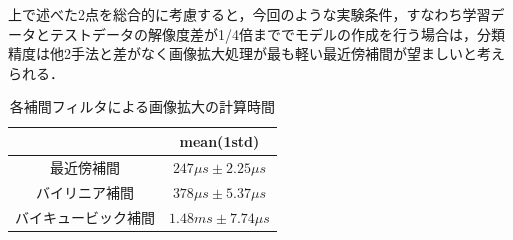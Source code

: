 \documentclass[a4j, 11pt]{jreport}
\begin{document}
上で述べた2点を総合的に考慮すると，今回のような実験条件，すなわち学習データとテストデータの解像度差が1/4倍まででモデルの作成を行う場合は，分類精度は他2手法と差がなく画像拡大処理が最も軽い最近傍補間が望ましいと考えられる．


\begin{table}[htbp]
  \centering
	\caption{各補間フィルタによる画像拡大の計算時間}
  \begin{tabular}{|c|c|}
		\hline
     & mean(1std) \\ \hline
    最近傍補間 & $247\mu s \pm 2.25\mu s$ \\ \hline
    バイリニア補間 & $378\mu s \pm 5.37\mu s$ \\ \hline
    バイキュービック補間 & $1.48ms \pm 7.74\mu s$ \\ \hline
  \end{tabular}
  \label{tb:calc_cost_by_interpolation}
\end{table}



\end{document}
